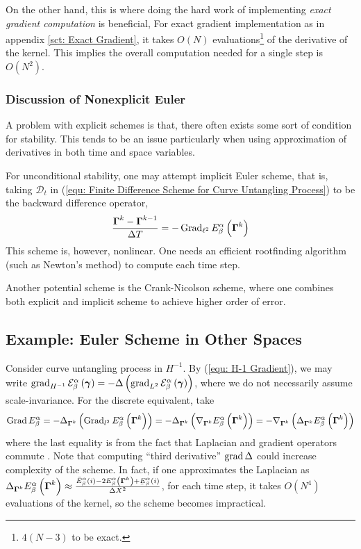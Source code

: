 \documentclass[../dissertation.tex]{subfiles}
\begin{document}
On the other hand, this is where doing the hard work of implementing \textit{exact gradient computation} is beneficial,
For exact gradient implementation as in appendix \ref{sct: Exact Gradient},
it takes $O \left( N \right)$ evaluations\footnote{$4 \left( N-3 \right)$ to be exact.} of the derivative of the kernel.
This implies the overall computation needed for a single step is $O \left( N^2 \right)$.

\subsubsection{Discussion of Nonexplicit Euler}
A problem with explicit schemes is that, there often exists some sort of condition for stability.
This tends to be an issue particularly when using approximation of derivatives in both time and space variables.

For unconditional stability, one may attempt implicit Euler scheme, that is,
taking $\mathcal{D}_t$ in (\ref{equ: Finite Difference Scheme for Curve Untangling Process}) to be the backward difference operator,
\begin{equation}
    \frac{\boldsymbol{\Gamma}^{k} - \boldsymbol{\Gamma}^{k-1}}{\Delta T} = -\operatorname{Grad}_{\ell^2} E_{\beta}^{\alpha} \left( \boldsymbol{\Gamma}^k \right)
\end{equation}
This scheme is, however, nonlinear.
One needs an efficient rootfinding algorithm (such as Newton's method) to compute each time step.

Another potential scheme is the Crank-Nicolson scheme,
where one combines both explicit and implicit scheme to achieve higher order of error.

\subsection{Example: Euler Scheme in Other Spaces}
Consider curve untangling process in $H^{-1}$.
By (\ref{equ: H-1 Gradient}), we may write $\operatorname{grad}_{H^{-1}} \mathcal{E}_{\beta}^{\alpha} \left( \boldsymbol{\gamma} \right) = - \Delta \left( \operatorname{grad}_{L^2} \mathcal{E}_{\beta}^{\alpha} \left( \boldsymbol{\gamma} \right)\right)$,
where we do not necessarily assume scale-invariance.
For the discrete equivalent, take
\begin{equation}
    \operatorname{Grad} E_{\beta}^{\alpha} = - \Delta_{\boldsymbol{\Gamma}^k} \left( \operatorname{Grad}_{l^2} E_{\beta}^{\alpha} \left( \boldsymbol{\Gamma}^k \right) \right) = - \Delta_{\boldsymbol{\Gamma}^k} \left( \nabla_{\boldsymbol{\Gamma}^k} E_{\beta}^{\alpha} \left( \boldsymbol{\Gamma}^k \right) \right)
    = -\nabla_{\boldsymbol{\Gamma}^k} \left( \Delta_{\boldsymbol{\Gamma}^k} E_{\beta}^{\alpha} \left( \boldsymbol{\Gamma}^k \right) \right)
\end{equation}
where the last equality is from the fact that Laplacian and gradient operators commute \cite{679160}.
Note that computing ``third derivative'' $\operatorname{grad} \Delta$ could increase complexity of the scheme.
In fact, if one approximates the Laplacian as $\laplacian_{\Gammabf^k} E_{\beta}^{\alpha} \left( \Gammabf^k \right)\approx \frac{\bar{E}_{\beta}^{\alpha} (i) - 2 E_{\beta}^{\alpha} \left( \Gammabf^k \right) + \underaccent{\bar}E_{\beta}^{\alpha} (i)}{\Delta X^2}$,
for each time step, it takes $O \left( N^4 \right)$ evaluations of the kernel, so the scheme becomes impractical.
\end{document}
